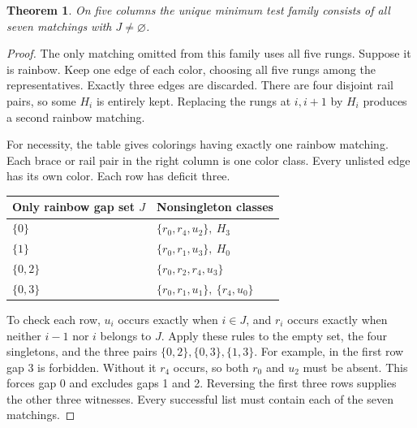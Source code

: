 \documentclass[11pt]{article}
\newtheorem{theorem}{Theorem}
\begin{document}
\begin{theorem}On five columns the unique minimum test family consists of
all seven matchings with \(J\ne\varnothing\).\end{theorem}
\begin{proof}
The only matching omitted from this family uses all five rungs. Suppose it
is rainbow. Keep one edge of each color, choosing all five rungs among the
representatives. Exactly three edges are discarded. There are four disjoint
rail pairs, so some \(H_i\) is entirely kept. Replacing the rungs at
\(i,i+1\) by \(H_i\) produces a second rainbow matching.

For necessity, the table gives colorings having exactly one rainbow matching.
Each brace or rail pair in the right column is one color class. Every
unlisted edge has its own color. Each row has deficit three.
\begin{center}\small
\begin{tabular}{@{}ll@{}}
\toprule
Only rainbow gap set \(J\) & Nonsingleton classes\\
\midrule
\(\{0\}\) & \(\{r_0,r_4,u_2\},\ H_3\)\\
\(\{1\}\) & \(\{r_0,r_1,u_3\},\ H_0\)\\
\(\{0,2\}\) & \(\{r_0,r_2,r_4,u_3\}\)\\
\(\{0,3\}\) & \(\{r_0,r_1,u_1\},\ \{r_4,u_0\}\)\\
\bottomrule
\end{tabular}
\end{center}
To check each row, \(u_i\) occurs exactly when \(i\in J\), and \(r_i\)
occurs exactly when neither \(i-1\) nor \(i\) belongs to \(J\). Apply these
rules to the empty set, the four singletons, and the three pairs
\(\{0,2\},\{0,3\},\{1,3\}\). For example, in the first row gap 3 is
forbidden. Without it \(r_4\) occurs, so both \(r_0\) and \(u_2\) must be
absent. This forces gap 0 and excludes gaps 1 and 2. Reversing the first
three rows supplies the other three witnesses. Every successful list must
contain each of the seven matchings.
\end{proof}

\newpage
\end{document}
